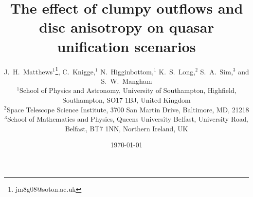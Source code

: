 \documentclass[useAMS,usenatbib]{mn2e_x}
\begin{document}


\def\py{\textsc{Python}}
\def\tar{\textsc{Tardis}}
\def\cld{\textsc{Cloudy}}
\def\agn{\textsc{Agnspec}}


\def\civ{C~\textsc{iv}}
\def\nv{N~\textsc{v}}
\def\hei{He~\textsc{i}}
\def\heii{He~\textsc{ii}}
\def\mg{Mg~\textsc{ii}}
\def\al{Al~\textsc{iii}}
\def\heii{He~\textsc{ii}}
\def\ovi{O~\textsc{vi}}
\def\la{Ly~$\alpha$}
\def\ha{H~$\alpha$}
\def\hb{H~$\beta$}



\def\araa{ARAA}
\def\nat{Nature}
\def\apjl{ApJ Letters}
\def\aapr{AAPR}
\def\ssr{SSR}
\def\apj{ApJ}
\def\pasp{PASP}
\def\aap{A\&A}
\def\mnras{MNRAS}
\def\aj{AJ}
\def\rmxaa{RMXAA}

%
%

\title
{
The effect of clumpy outflows
and disc anisotropy on quasar unification scenarios
}



\author[Matthews et al.]{J.~H.~Matthews$^1$\thanks{jm8g08@soton.ac.uk}, C.~Knigge,$^1$
N.~Higginbottom,$^1$ K.~S.~Long,$^2$ S.~A.~Sim,$^3$ and S.~W.~Mangham
\medskip  
\\$^1$School of Physics and Astronomy, University of Southampton, Highfield, Southampton, SO17 1BJ, United Kingdom
\\$^2$Space Telescope Science Institute, 3700 San Martin Drive, Baltimore, MD, 21218
\\$^3$School of Mathematics and Physics, Queens University Belfast, University Road, Belfast, BT7 1NN, Northern Ireland, UK}

\date{\today}


%
%

\maketitle
\end{document}
